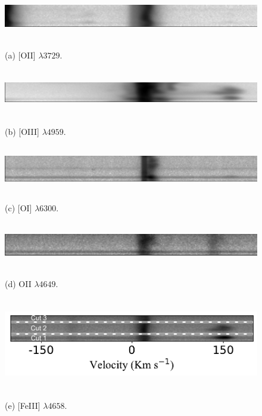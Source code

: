 \documentclass[fleqn,usenatbib]{mnras}
\begin{document}
\begin{figure}
  \begin{minipage}{6cm}
    \centering\includegraphics[height=2cm,width=\columnwidth]{2D_3729.pdf}
    \centerline{(a) [O\thinspace II] $\lambda 3729$.}
    \smallskip
  \end{minipage}
  \begin{minipage}{6cm}
    \centering\includegraphics[height=2cm,width=\columnwidth]{2D_4959.pdf}
    \centerline{(b) [O\thinspace III] $\lambda 4959$.}
    \smallskip
  \end{minipage}
 
  \begin{minipage}{6cm}
    \centering\includegraphics[height=2cm , width=\columnwidth]{2D_6300.pdf}
    \centerline{(c) [O\thinspace I] $\lambda 6300$.}
    \smallskip
  \end{minipage}
  \begin{minipage}{6cm}
    \centering\includegraphics[height=2cm , width=\columnwidth]{2D_4649.pdf}
    \centerline{(d) O\thinspace II $\lambda 4649$.}
    \smallskip
  \end{minipage}
\begin{minipage}{12.0cm}
  \centering\includegraphics[height=4cm, width=\columnwidth]{2D_4658_cuts_named.pdf}
  \centerline{(e) [Fe\thinspace III] $\lambda 4658$.} 
\end{minipage}


\end{figure}
\end{document}

